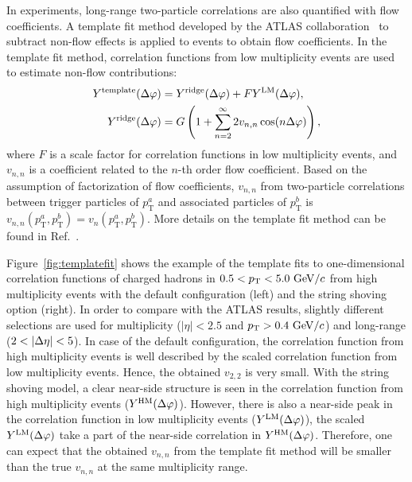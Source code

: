 In experiments, long-range two-particle correlations are also quantified with flow coefficients.
A template fit method developed by the ATLAS collaboration~\cite{Aad:2015gqa} to subtract non-flow effects is applied to \pythia events to obtain flow coefficients.
In the template fit method, correlation functions from low multiplicity events are used to estimate non-flow contributions:
\begin{align}
    Y^\mathrm{template}(\mbox{$\Delta\varphi$}) &= Y^\mathrm{ridge}(\mbox{$\Delta\varphi$}) + FY^\mathrm{LM}(\mbox{$\Delta\varphi$}),\nonumber\\
    Y^\mathrm{ridge}(\mbox{$\Delta\varphi$}) &= G \left( 1 + \sum^{\infty}_{n=2} 2 v_{n,n} \cos(n\mbox{$\Delta\varphi$}) \right),
\end{align}
where $F$ is a scale factor for correlation functions in low multiplicity events, and $v_{n,n}$ is a coefficient related to the $n$-th order flow coefficient.
Based on the assumption of factorization of flow coefficients, $v_{n,n}$ from two-particle correlations between trigger particles of $p_\mathrm{T}^{a}$ and associated particles of $p_\mathrm{T}^{b}$ is $v_{n,n}(p_\mathrm{T}^{a}, p_\mathrm{T}^{b}) = v_{n}(p_\mathrm{T}^{a}, p_\mathrm{T}^{b})$.
More details on the template fit method can be found in Ref.~\cite{Aad:2015gqa}.

Figure~\ref{fig:templatefit} shows the example of the template fits to one-dimensional correlation functions of charged hadrons in $0.5<\mbox{$p_{\mathrm{T}}$}<5.0~\mathrm{GeV}/c$ from high multiplicity \pythia \pp events with the default configuration (left) and the string shoving option (right).
In order to compare with the ATLAS results, slightly different selections are used for multiplicity ($|\eta|<2.5$ and $\mbox{$p_{\mathrm{T}}$}>0.4~\mathrm{GeV}/c$) and long-range ($2<|\deta|<5$).
In case of the default configuration, the correlation function from high multiplicity events is well described by the scaled correlation function from low multiplicity events.
Hence, the obtained $v_{2,2}$ is very small.
With the string shoving model, a clear near-side structure is seen in the correlation function from high multiplicity events ($Y^\mathrm{HM}(\mbox{$\Delta\varphi$})$).
However, there is also a near-side peak in the correlation function in low multiplicity events ($Y^\mathrm{LM}(\mbox{$\Delta\varphi$})$), the scaled $Y^\mathrm{LM}(\mbox{$\Delta\varphi$})$ take a part of the near-side correlation in $Y^\mathrm{HM}(\mbox{$\Delta\varphi$})$.
Therefore, one can expect that the obtained $v_{n,n}$ from the template fit method will be smaller than the true $v_{n,n}$ at the same multiplicity range.


